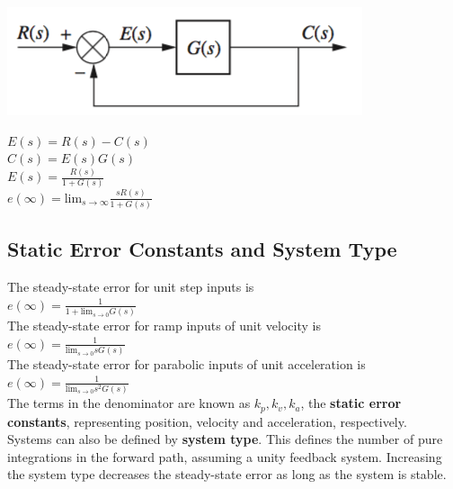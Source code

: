 \documentclass[11pt]{article}
\begin{document}
    \begin{center}
        \includegraphics[width=300 px]{img/unityfeedback} \\
    \end{center}

    \begin{center}
        $E(s) = R(s) - C(s)$ \\
        $C(s) = E(s)G(s)$ \\ 
        $E(s) = \frac{R(s)}{1 + G(s)}$ \\
        $e(\infty) = \text{lim}_{s\rightarrow \infty} \frac{sR(s)}{1 + G(s)} $ \\ 
    \end{center}

    \subsection{Static Error Constants and System Type}

    The steady-state error for unit step inputs is \\ 

    $e(\infty) = \frac{1}{1 + \text{lim}_{s\rightarrow 0} G(s)}$ \\
    
    The steady-state error for ramp inputs of unit velocity is \\
    
    $e(\infty) = \frac{1}{\text{lim}_{s\rightarrow 0} sG(s)}$ \\

    The steady-state error for parabolic inputs of unit acceleration is \\
    
    $e(\infty) = \frac{1}{\text{lim}_{s\rightarrow 0} s^2G(s)}$ \\


    The terms in the denominator are known as $k_p, k_v, k_a$, the \textbf{static error constants}, representing position, velocity and acceleration, respectively. \\
    
    Systems can also be defined by \textbf{system type}. This defines the number of pure integrations in the forward path, assuming a unity feedback system. Increasing the system type decreases the steady-state error as long as the system is stable.
\end{document}
